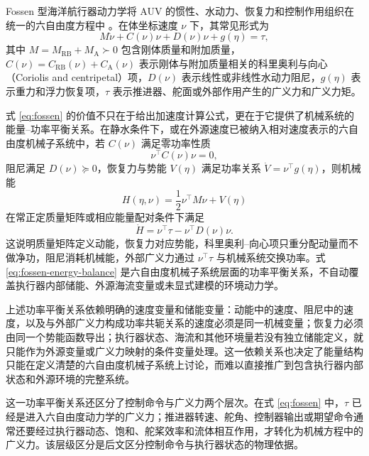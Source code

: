 \documentclass[UTF8,zihao=-4]{ctexrep}
\begin{document}
Fossen 型海洋航行器动力学将 AUV 的惯性、水动力、恢复力和控制作用组织在统一的六自由度方程中 \citep{fossen2011handbook,fossen2021handbook}。在体坐标速度 \(\nu\) 下，其常见形式为
\begin{equation}
  M\dot\nu+C(\nu)\nu+D(\nu)\nu+g(\eta)=\tau ,
  \label{eq:fossen}
\end{equation}
其中 \(M=M_{\mathrm{RB}}+M_{\mathrm{A}}\succ0\) 包含刚体质量和附加质量，\(C(\nu)=C_{\mathrm{RB}}(\nu)+C_{\mathrm{A}}(\nu)\) 表示刚体与附加质量相关的科里奥利与向心（Coriolis and centripetal）项，\(D(\nu)\) 表示线性或非线性水动力阻尼，\(g(\eta)\) 表示重力和浮力恢复项，\(\tau\) 表示推进器、舵面或外部作用产生的广义力和广义力矩。

式 \eqref{eq:fossen} 的价值不只在于给出加速度计算公式，更在于它提供了机械系统的能量--功率平衡关系。在静水条件下，或在外源速度已被纳入相对速度表示的六自由度机械子系统中，若 \(C(\nu)\) 满足零功率性质
\begin{equation}
  \nu^\top C(\nu)\nu=0,
\end{equation}
阻尼满足 \(D(\nu)\succeq0\)，恢复力与势能 \(V(\eta)\) 满足功率关系 \(\dot V=\nu^\top g(\eta)\)，则机械能
\begin{equation}
  H(\eta,\nu)=\frac12\nu^\top M\nu+V(\eta)
  \label{eq:fossen-energy}
\end{equation}
在常正定质量矩阵或相应能量配对条件下满足
\begin{equation}
  \dot H=\nu^\top\tau-\nu^\top D(\nu)\nu .
  \label{eq:fossen-energy-balance}
\end{equation}
这说明质量矩阵定义动能，恢复力对应势能，科里奥利--向心项只重分配动量而不做净功，阻尼消耗机械能，外部广义力通过 \(\nu^\top\tau\) 与机械系统交换功率。式 \eqref{eq:fossen-energy-balance} 是六自由度机械子系统层面的功率平衡关系，不自动覆盖执行器内部储能、外源海流变量或未显式建模的环境动力学。

上述功率平衡关系依赖明确的速度变量和储能变量：动能中的速度、阻尼中的速度，以及与外部广义力构成功率共轭关系的速度必须是同一机械变量；恢复力必须由同一个势能函数导出；执行器状态、海流和其他环境量若没有独立储能定义，就只能作为外源变量或广义力映射的条件变量处理。这一依赖关系也决定了能量结构只能在定义清楚的六自由度机械子系统上讨论，而难以直接推广到包含执行器内部状态和外源环境的完整系统。

这一功率平衡关系还区分了控制命令与广义力两个层次。在式 \eqref{eq:fossen} 中，\(\tau\) 已经是进入六自由度动力学的广义力；推进器转速、舵角、控制器输出或期望命令通常还要经过执行器动态、饱和、舵桨效率和流体相互作用，才转化为机械方程中的广义力。该层级区分是后文区分控制命令与执行器状态的物理依据。
\end{document}
